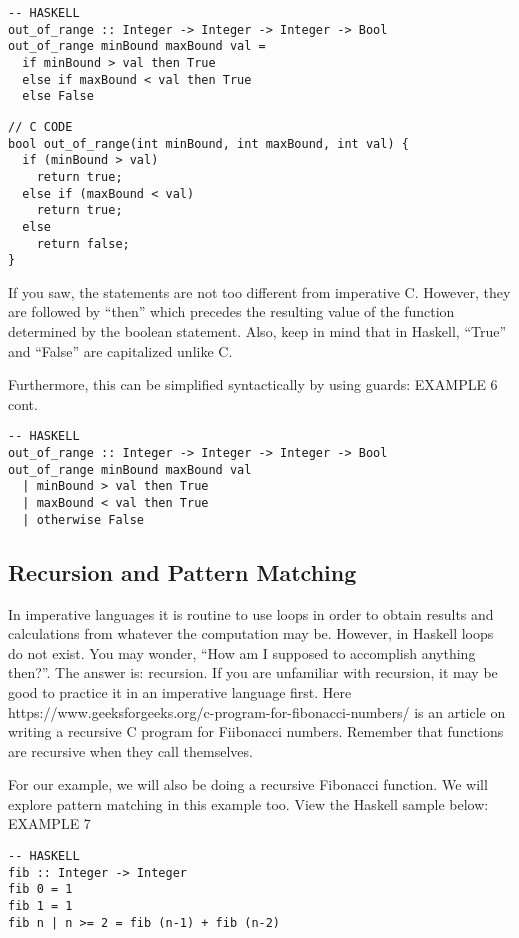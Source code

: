\documentclass{article}
\begin{document}
\begin{lstlisting}[style=HaskellStyle]
-- HASKELL
out_of_range :: Integer -> Integer -> Integer -> Bool
out_of_range minBound maxBound val =
  if minBound > val then True
  else if maxBound < val then True
  else False
\end{lstlisting}

\begin{lstlisting}[style=CStyle]
// C CODE
bool out_of_range(int minBound, int maxBound, int val) {
  if (minBound > val)
    return true;
  else if (maxBound < val)
    return true;
  else 
    return false;
}
\end{lstlisting}

\medskip\noindent
If you saw, the statements are not too different from imperative C. However, they are followed by “then” which precedes the resulting value of the function determined by the boolean statement. Also, keep in mind that in Haskell, “True” and “False” are capitalized unlike C.

\medskip\noindent
Furthermore, this can be simplified syntactically by using guards: EXAMPLE 6 cont.

\begin{lstlisting}[style=HaskellStyle]
-- HASKELL
out_of_range :: Integer -> Integer -> Integer -> Bool
out_of_range minBound maxBound val
  | minBound > val then True
  | maxBound < val then True
  | otherwise False
\end{lstlisting}

\subsection{Recursion and Pattern Matching}
\medskip\noindent
In imperative languages it is routine to use loops in order to obtain results and calculations from whatever the computation may be. However, in Haskell loops do not exist. You may wonder, “How am I supposed to accomplish anything then?”. The answer is: recursion. If you are unfamiliar with recursion, it may be good to practice it in an imperative language first. Here https://www.geeksforgeeks.org/c-program-for-fibonacci-numbers/ is an article on writing a recursive C program for Fiibonacci numbers. Remember that functions are recursive when they call themselves.

\medskip\noindent
For our example, we will also be doing a recursive Fibonacci function. We will explore pattern matching in this example too. View the Haskell sample below: EXAMPLE 7

\begin{lstlisting}[style=HaskellStyle]
-- HASKELL
fib :: Integer -> Integer
fib 0 = 1
fib 1 = 1
fib n | n >= 2 = fib (n-1) + fib (n-2)
\end{lstlisting}
\end{document}
